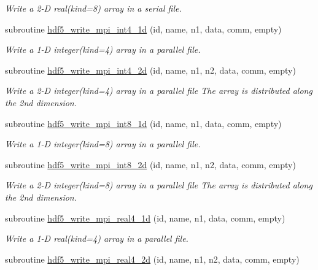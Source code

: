 \begin{DoxyCompactItemize}
\begin{DoxyCompactList}\small\item\em Write a 2-\/D real(kind=8) array in a serial file. \end{DoxyCompactList}\item 
subroutine \hyperlink{namespacemodhdf5_af38c097f92a373ed47962ec1e02f4cb3}{hdf5\+\_\+write\+\_\+mpi\+\_\+int4\+\_\+1d} (id, name, n1, data, comm, empty)
\begin{DoxyCompactList}\small\item\em Write a 1-\/D integer(kind=4) array in a parallel file. \end{DoxyCompactList}\item 
subroutine \hyperlink{namespacemodhdf5_a727abaf04f522d9a2a2accdbf3512a96}{hdf5\+\_\+write\+\_\+mpi\+\_\+int4\+\_\+2d} (id, name, n1, n2, data, comm, empty)
\begin{DoxyCompactList}\small\item\em Write a 2-\/D integer(kind=4) array in a parallel file The array is distributed along the 2nd dimension. \end{DoxyCompactList}\item 
subroutine \hyperlink{namespacemodhdf5_a3402bae4c5e2b0e315c1728b264798da}{hdf5\+\_\+write\+\_\+mpi\+\_\+int8\+\_\+1d} (id, name, n1, data, comm, empty)
\begin{DoxyCompactList}\small\item\em Write a 1-\/D integer(kind=8) array in a parallel file. \end{DoxyCompactList}\item 
subroutine \hyperlink{namespacemodhdf5_a2ca2e47f5fe959ef8cbf3bdad5bef7f8}{hdf5\+\_\+write\+\_\+mpi\+\_\+int8\+\_\+2d} (id, name, n1, n2, data, comm, empty)
\begin{DoxyCompactList}\small\item\em Write a 2-\/D integer(kind=8) array in a parallel file The array is distributed along the 2nd dimension. \end{DoxyCompactList}\item 
subroutine \hyperlink{namespacemodhdf5_aa5b200799b385418068f6c916bbbad34}{hdf5\+\_\+write\+\_\+mpi\+\_\+real4\+\_\+1d} (id, name, n1, data, comm, empty)
\begin{DoxyCompactList}\small\item\em Write a 1-\/D real(kind=4) array in a parallel file. \end{DoxyCompactList}\item 
subroutine \hyperlink{namespacemodhdf5_a6c880adf75b8b8a5ad56120effed2f6a}{hdf5\+\_\+write\+\_\+mpi\+\_\+real4\+\_\+2d} (id, name, n1, n2, data, comm, empty)

\end{DoxyCompactItemize}
